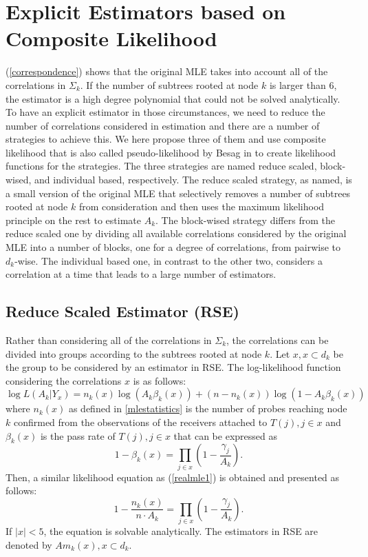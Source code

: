 \documentclass[10pt,onecolumn]{IEEEtran}
\begin{document}
\section{Explicit Estimators based on Composite Likelihood} \label{section 4}
(\ref{correspondence}) shows that the original MLE takes into account all of the correlations in $\Sigma_k$. If the number of subtrees rooted at node $k$ is larger than 6, the estimator is a high degree polynomial that could not be solved analytically. To have an explicit estimator in those circumstances, we need to reduce the number of correlations considered in estimation and there are a number of strategies to achieve this. We here propose three of them and use composite likelihood that  is also called
pseudo-likelihood by Besag in \cite{Besay74} to create likelihood functions for the strategies. The three strategies are named  reduce scaled, block-wised, and individual based, respectively. The reduce scaled strategy, as named, is a small version of the original MLE that selectively removes a  number of subtrees rooted at node $k$ from consideration and then uses the maximum likelihood principle on the rest to estimate $A_k$. The block-wised strategy differs from the reduce scaled one by dividing all available correlations considered by the original MLE into a number of blocks, one for a degree of correlations, from pairwise to $d_k$-wise. The individual based one,  in contrast to the other two, considers a correlation at a time that leads to a large number of estimators.

\subsection{Reduce Scaled Estimator (RSE)}

Rather than considering all of the correlations in $\Sigma_k$, the correlations can be divided into groups according to the subtrees rooted at node $k$. Let $x, x \subset d_k$ be the group to be considered by an estimator in RSE. The log-likelihood function considering the correlations $x$ is as follows:
 \begin{equation}
\log L(A_k|Y_x)=n_k(x)\log (A_k\beta_k(x))+(n-n_k(x))\log(1-A_k\beta_k(x))
 \label{likelihood RSE}
 \end{equation}
 where $n_k(x)$ as defined in \ref{mlestatistics} is the number of probes reaching node $k$ confirmed from the observations of the receivers attached to $T(j), j \in x$ and
 $\beta_k(x)$ is the pass rate of  $T(j), j \in x$ that can be expressed as
\begin{equation}
1-\beta_k(x)=\prod_{j \in x} (1-\dfrac{\gamma_j}{A_k}).
\label{beta-k1}
\end{equation}
Then, a similar likelihood equation as (\ref{realmle1}) is obtained and presented as follows:
\begin{equation}
1-\dfrac{n_k(x)}{n \cdot A_k}=\prod_{j \in x} (1-\dfrac{\gamma_j}{A_k}).
\label{estimator MLEPC1}
\end{equation}
If $|x|<5$, the equation is solvable analytically. The estimators in RSE are denoted by $Am_k(x), x \subset d_k$.
\end{document}
